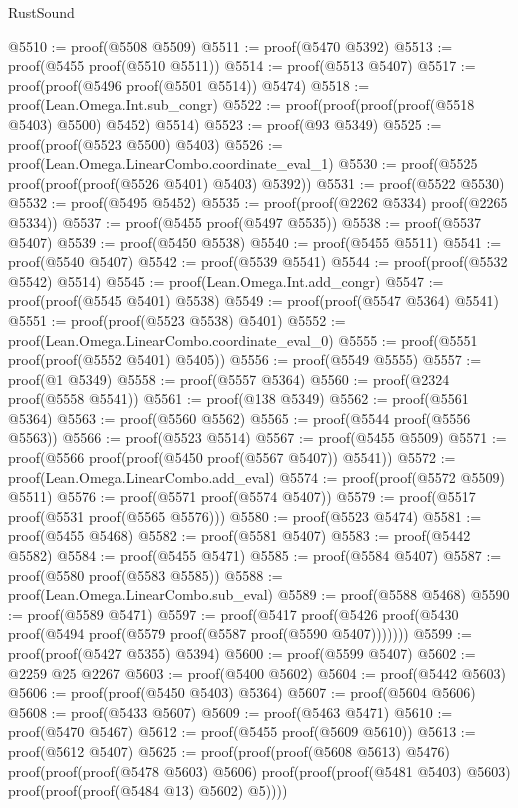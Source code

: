 \begin{lexlean}{RustSound}
\begin{coremodule}
@5510 := proof(@5508 @5509)
@5511 := proof(@5470 @5392)
@5513 := proof(@5455 proof(@5510 @5511))
@5514 := proof(@5513 @5407)
@5517 := proof(proof(@5496 proof(@5501 @5514)) @5474)
@5518 := proof(Lean.Omega.Int.sub_congr)
@5522 := proof(proof(proof(proof(@5518 @5403) @5500) @5452) @5514)
@5523 := proof(@93 @5349)
@5525 := proof(proof(@5523 @5500) @5403)
@5526 := proof(Lean.Omega.LinearCombo.coordinate_eval_1)
@5530 := proof(@5525 proof(proof(proof(@5526 @5401) @5403) @5392))
@5531 := proof(@5522 @5530)
@5532 := proof(@5495 @5452)
@5535 := proof(proof(@2262 @5334) proof(@2265 @5334))
@5537 := proof(@5455 proof(@5497 @5535))
@5538 := proof(@5537 @5407)
@5539 := proof(@5450 @5538)
@5540 := proof(@5455 @5511)
@5541 := proof(@5540 @5407)
@5542 := proof(@5539 @5541)
@5544 := proof(proof(@5532 @5542) @5514)
@5545 := proof(Lean.Omega.Int.add_congr)
@5547 := proof(proof(@5545 @5401) @5538)
@5549 := proof(proof(@5547 @5364) @5541)
@5551 := proof(proof(@5523 @5538) @5401)
@5552 := proof(Lean.Omega.LinearCombo.coordinate_eval_0)
@5555 := proof(@5551 proof(proof(@5552 @5401) @5405))
@5556 := proof(@5549 @5555)
@5557 := proof(@1 @5349)
@5558 := proof(@5557 @5364)
@5560 := proof(@2324 proof(@5558 @5541))
@5561 := proof(@138 @5349)
@5562 := proof(@5561 @5364)
@5563 := proof(@5560 @5562)
@5565 := proof(@5544 proof(@5556 @5563))
@5566 := proof(@5523 @5514)
@5567 := proof(@5455 @5509)
@5571 := proof(@5566 proof(proof(@5450 proof(@5567 @5407)) @5541))
@5572 := proof(Lean.Omega.LinearCombo.add_eval)
@5574 := proof(proof(@5572 @5509) @5511)
@5576 := proof(@5571 proof(@5574 @5407))
@5579 := proof(@5517 proof(@5531 proof(@5565 @5576)))
@5580 := proof(@5523 @5474)
@5581 := proof(@5455 @5468)
@5582 := proof(@5581 @5407)
@5583 := proof(@5442 @5582)
@5584 := proof(@5455 @5471)
@5585 := proof(@5584 @5407)
@5587 := proof(@5580 proof(@5583 @5585))
@5588 := proof(Lean.Omega.LinearCombo.sub_eval)
@5589 := proof(@5588 @5468)
@5590 := proof(@5589 @5471)
@5597 := proof(@5417
      proof(@5426 proof(@5430 proof(@5494 proof(@5579 proof(@5587 proof(@5590 @5407)))))))
@5599 := proof(proof(@5427 @5355) @5394)
@5600 := proof(@5599 @5407)
@5602 := @2259 @25 @2267
@5603 := proof(@5400 @5602)
@5604 := proof(@5442 @5603)
@5606 := proof(proof(@5450 @5403) @5364)
@5607 := proof(@5604 @5606)
@5608 := proof(@5433 @5607)
@5609 := proof(@5463 @5471)
@5610 := proof(@5470 @5467)
@5612 := proof(@5455 proof(@5609 @5610))
@5613 := proof(@5612 @5407)
@5625 := proof(proof(proof(@5608 @5613) @5476)
      proof(proof(proof(@5478 @5603) @5606)
          proof(proof(proof(@5481 @5403) @5603) proof(proof(proof(@5484 @13) @5602) @5))))

\end{coremodule}
\end{lexlean}
